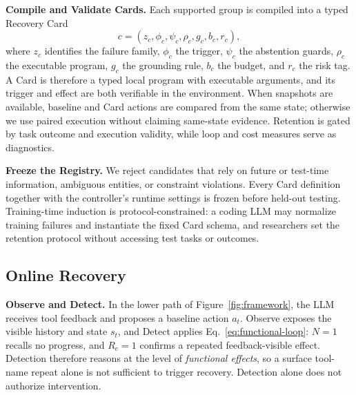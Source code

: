 \documentclass[letterpaper]{article}
\begin{document}
\textbf{Compile and Validate Cards.}\quad
Each supported group is compiled into a typed Recovery Card
\begin{equation}
c=(z_c,\phi_c,\psi_c,\rho_c,g_c,b_c,r_c),
\label{eq:card}
\end{equation}
where $z_c$ identifies the failure family, $\phi_c$ the trigger, $\psi_c$ the abstention guards, $\rho_c$ the executable program, $g_c$ the grounding rule, $b_c$ the budget, and $r_c$ the risk tag. A Card is therefore a typed local program with executable arguments, and its trigger and effect are both verifiable in the environment. When snapshots are available, baseline and Card actions are compared from the same state; otherwise we use paired execution without claiming same-state evidence. Retention is gated by task outcome and execution validity, while loop and cost measures serve as diagnostics.

\textbf{Freeze the Registry.}\quad
We reject candidates that rely on future or test-time information, ambiguous entities, or constraint violations. Every Card definition together with the controller's runtime settings is frozen before held-out testing. Training-time induction is protocol-constrained: a coding LLM may normalize training failures and instantiate the fixed Card schema, and researchers set the retention protocol without accessing test tasks or outcomes.

\subsection*{Online Recovery}

\textbf{Observe and Detect.}\quad
In the lower path of Figure~\ref{fig:framework}, the LLM receives tool feedback and proposes a baseline action $a_t$. Observe exposes the visible history and state $s_t$, and Detect applies Eq.~\ref{eq:functional-loop}: $N=1$ recalls no progress, and $R_e=1$ confirms a repeated feedback-visible effect. Detection therefore reasons at the level of \emph{functional effects}, so a surface tool-name repeat alone is not sufficient to trigger recovery. Detection alone does not authorize intervention.
\end{document}
